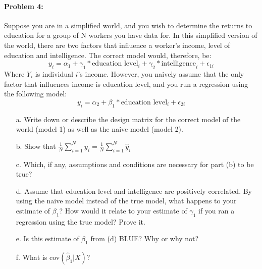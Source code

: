 \documentclass{article}
\begin{document}
\paragraph{Problem 4:}
Suppose you are in a simplified world, and you wish to determine the returns to education for a group of N workers you have data for.  In this simplified version of the world, there are two factors that influence a worker's income, level of education and intelligence.  The correct model would, therefore, be:
\begin{equation} y_{i} = \alpha_{1} + \gamma_{1}*\text{education level}_{i} + \gamma_{2}*\text{intelligence}_{i} + \epsilon_{1i} \end{equation}
Where $Y_{i}$ is individual $i$'s income.  However, you naively assume that the only factor that influences income is education level, and you run a regression using the following model:
\begin{equation} y_{i} = \alpha_{2} + \beta_{1}*\text{education level}_{i} + \epsilon_{2i}  \end{equation}
\begin{itemize}

\item[a.] Write down or describe the design matrix for the correct model of the world (model 1) as well as the naive model (model 2).
\item[b.] Show that $\frac{1}{N}\sum_{i = 1}^N y_{i} = \frac{1}{N}\sum_{i = 1}^N \hat{y}_{i}$
\item[c.] Which, if any, assumptions and conditions are necessary for part (b) to be true?
\item[d.] Assume that education level and intelligence are positively correlated.  By using the naive model instead of the true model, what happens to your estimate of $\beta_{1}$?  How would it relate to your estimate of $\gamma_{1}$ if you ran a regression using the true model?  Prove it.
\item[e.] Is this estimate of $\beta_{1}$ from (d) BLUE?  Why or why
  not?
\item[f.]  What is cov$(\hat{\beta}_1|X)$? 
\end{itemize}

\end{document}
